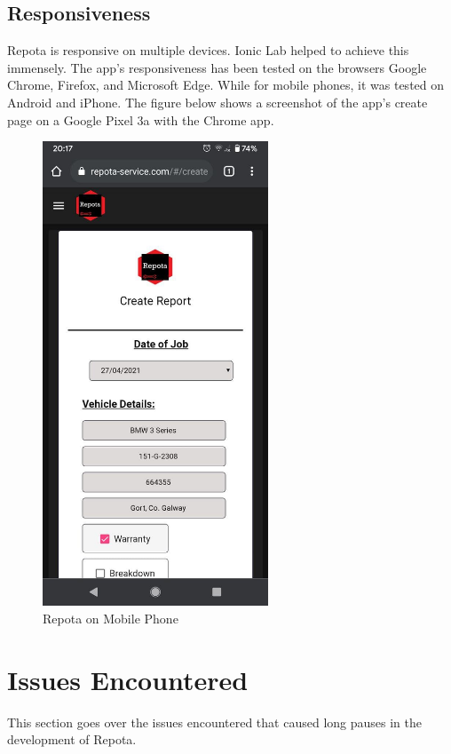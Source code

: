 \subsection{Responsiveness}
Repota is responsive on multiple devices. Ionic Lab helped to achieve this immensely. The app's responsiveness has been tested on the browsers Google Chrome, Firefox, and Microsoft Edge. While for mobile phones, it was tested on Android and iPhone. The figure below shows a screenshot of the app's create page on a Google Pixel 3a with the Chrome app.

\begin{figure}[H]
    \centering
    \caption{Repota on Mobile Phone}
    \label{image:mobileHome}
    \includegraphics[width=0.6\textwidth]{images/repota/UI/create-mobile-phone.jpg}
\end{figure}

\newpage
\section{Issues Encountered}
This section goes over the issues encountered that caused long pauses in the development of Repota.

